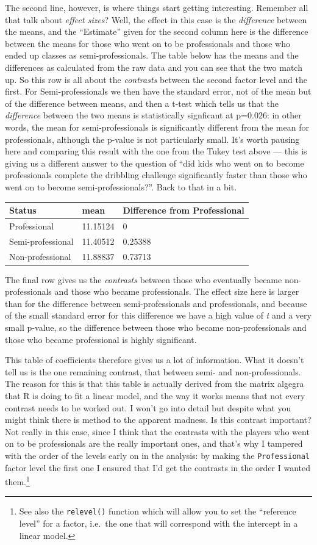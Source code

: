 \documentclass[
]{book}
\begin{document}
The second line, however, is where things start getting interesting. Remember all that talk about \emph{effect sizes}? Well, the effect in this case is the \emph{difference} between the means, and the ``Estimate'' given for the second column here is the difference between the means for those who went on to be professionals and those who ended up classes as semi-professionals. The table below has the means and the differences as calculated from the raw data and you can see that the two match up. So this row is all about the \emph{contrasts} between the second factor level and the first. For Semi-professionals we then have the standard error, not of the mean but of the difference between means, and then a t-test which tells us that the \emph{difference} between the two means is statistically signficant at p=0.026: in other words, the mean for semi-professionals is significantly different from the mean for professionals, although the p-value is not particularly small. It's worth pausing here and comparing this result with the one from the Tukey test above --- this is giving us a different answer to the question of ``did kids who went on to become professionals complete the dribbling challenge significantly faster than those who went on to become semi-professionals?''. Back to that in a bit.

\begin{longtable}[]{@{}lll@{}}
\toprule
Status & mean & Difference from Professional\tabularnewline
\midrule
\endhead
Professional & 11.15124 & 0\tabularnewline
Semi-professional & 11.40512 & 0.25388\tabularnewline
Non-professional & 11.88837 & 0.73713\tabularnewline
\bottomrule
\end{longtable}

The final row gives us the \emph{contrasts} between those who eventually became non-professionals and those who became professionals. The effect size here is larger than for the difference between semi-professionals and professionals, and because of the small standard error for this difference we have a high value of \emph{t} and a very small p-value, so the difference between those who became non-professionals and those who became professional is highly significant.

This table of coefficients therefore gives us a lot of information. What it doesn't tell us is the one remaining contrast, that between semi- and non-professionals. The reason for this is that this table is actually derived from the matrix algegra that R is doing to fit a linear model, and the way it works means that not every contrast needs to be worked out. I won't go into detail but despite what you might think there is method to the apparent madness. Is this contrast important? Not really in this case, since I think that the contrasts with the players who went on to be professionals are the really important ones, and that's why I tampered with the order of the levels early on in the analysis: by making the \texttt{Professional} factor level the first one I ensured that I'd get the contrasts in the order I wanted them.\footnote{See also the \texttt{relevel()} function which will allow you to set the ``reference level'' for a factor, i.e.~the one that will correspond with the intercept in a linear model.}
\end{document}
